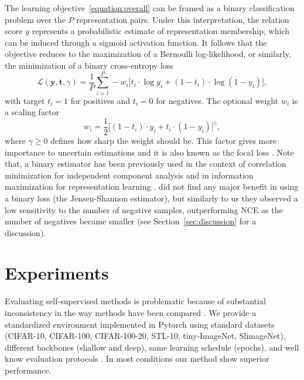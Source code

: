 \documentclass{article}
\begin{document}
The learning objective~\eqref{equation:overall} can be framed as a binary classification problem over the $P$ representation pairs. Under this interpretation, the relation score $y$ represents a probabilistic estimate of representation membership, which can be induced through a sigmoid activation function.
It follows that the objective reduces to the maximization of a Bernoulli log-likelihood, or similarly, the minimization of a binary cross-entropy loss
\begin{equation}
\mathcal{L}(\mathbf{y}, \mathbf{t}, \gamma) = \frac{1}{P} \sum_{i=1}^{P} - w_i \Big[ t_i \cdot \log y_i + (1 - t_i) \cdot \log (1 - y_i) \Big],
\end{equation}
with target $t_i=1$ for positives and $t_i=0$ for negatives. The optional weight $w_i$ is a scaling factor
\begin{equation}
w_i = \frac{1}{2} \Big[ (1 - t_i) \cdot y_i + t_i \cdot (1 - y_i) \Big]^{\gamma},
\end{equation}
where $\gamma \geq 0$ defines how sharp the weight should be. This factor gives more importance to uncertain estimations and it is also known as the focal loss \citep{lin2017focal}.
Note that, a binary estimator has been previously used in the context of correlation minimization for independent component analysis \citep{brakel2017learning} and in information maximization for representation learning \citep{hjelm2018learning}. \cite{hjelm2018learning} did not find any major benefit in using a binary loss (the Jensen-Shannon estimator), but similarly to us they observed a low sensitivity to the number of negative samples, outperforming NCE as the number of negatives became smaller (see Section~\ref{sec:discussion} for a discussion).

\section{Experiments}\label{sec:experiments}

Evaluating self-supervised methods is problematic because of substantial inconsistency in the way methods have been compared \citep{kolesnikov2019revisiting, musgrave2020metric}. We provide a standardized environment implemented in Pytorch using standard datasets (CIFAR-10, CIFAR-100, CIFAR-100-20, STL-10, tiny-ImageNet, SlimageNet), different backbones (shallow and deep), same learning schedule (epochs), and well know evaluation protocols \citep{kolesnikov2019revisiting}. In most conditions our method show superior performance.
\end{document}
